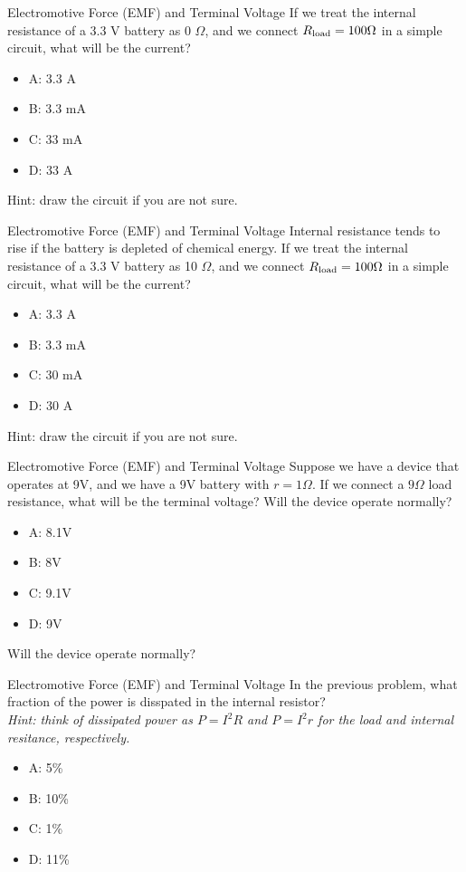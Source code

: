 \documentclass{beamer}
\begin{document}
\begin{frame}{Electromotive Force (EMF) and Terminal Voltage}
If we treat the internal resistance of a 3.3 V battery as 0 $\Omega$, and we connect $R_{\rm load} = 100 \Omega$ in a simple circuit, what will be the current?
\begin{itemize}
\item A: 3.3 A
\item B: 3.3 mA
\item C: 33 mA
\item D: 33 A
\end{itemize}
\footnotesize{Hint: draw the circuit if you are not sure.}
\end{frame}

\begin{frame}{Electromotive Force (EMF) and Terminal Voltage}
Internal resistance tends to rise if the battery is depleted of chemical energy.  If we treat the internal resistance of a 3.3 V battery as 10 $\Omega$, and we connect $R_{\rm load} = 100 \Omega$ in a simple circuit, what will be the current?
\begin{itemize}
\item A: 3.3 A
\item B: 3.3 mA
\item C: 30 mA
\item D: 30 A
\end{itemize}
\footnotesize{Hint: draw the circuit if you are not sure.}
\end{frame}

\begin{frame}{Electromotive Force (EMF) and Terminal Voltage}
Suppose we have a device that operates at 9V, and we have a 9V battery with $r = 1 \Omega$.  If we connect a $9 \Omega$ load resistance, what will be the terminal voltage?  Will the device operate normally?
\begin{itemize}
\item A: 8.1V
\item B: 8V
\item C: 9.1V
\item D: 9V
\end{itemize}
\footnotesize{Will the device operate normally?}
\end{frame}

\begin{frame}{Electromotive Force (EMF) and Terminal Voltage}
In the previous problem, what fraction of the power is disspated in the internal resistor?  \\ \vspace{0.5cm}
\footnotesize
 \textit{Hint: think of dissipated power as $P = I^2 R$ and $P = I^2 r$ for the load and internal resitance, respectively.}
 \normalsize
\begin{itemize}
\item A: 5\%
\item B: 10\%
\item C: 1\%
\item D: 11\%
\end{itemize}
\end{frame}
\end{document}

